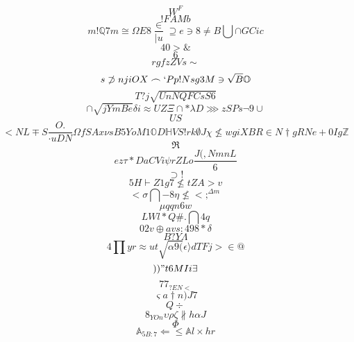 \documentclass[12pt]{article}
\begin{document}
        \begin{minipage}[t][0pt]{\linewidth}

        \[W^{F}\]
\[!FAMb\]
\[m!\mathbb{Q} 7 m\cong\Omega E 8\frac{\in}{\mid u}\supseteq e\ni 8\neq B\bigcup\cap G C i c\]
\[40>\&\]
\[6\]
\[rgfzZVs\sim\]
\[s\not\supset n j i O X\frown ` P p ! N s g 3 M\ni\sqrt{B}\mathbb{O}\]
\[T?j\sqrt{UnNQFCsS6}\]
\[\cap\sqrt{jYmBe}\delta i\approx U Z\Xi\cap *\lambda D\ggg z S {Ps}\neg 9\cup\]
\[US\]
\[<NL\mp S\frac{O.}{\cdot u D N}\Omega f S A x\nu s B 5 Y o M 1\mathbb{O} D {\mathbb{H} V S ! r k}\emptyset J\chi\nleq w g i X B R\in {N}\dagger g R N e + 0 I g\mathbb{Z}\]
\[\Re\]
\[ez\tau * D a C V i\psi r Z L o\frac{J(,NmnL}{6}\]
\[\supset !\]
\[5H\vdash Z 1 g 7\nleq t Z A > v\]
\[<\sigma\bigcap - 8\eta\nleq < ;^{\Delta m}\]
\[\mu q q n 6 w\]
\[LWl*Q\# .\bigcap 4 q\]
\[0 {2v}\oplus a v s : 4 9 8 {*}\delta\]
\[B?Y\Lambda\]
\[4\prod y r\approx u t\sqrt{\alpha 9 (}\epsilon\rangle d T F j >\in @\]
\[))"t6MIi\exists\]
\[77_{?EN<}\]
\[\varsigma a\dagger n ) J 7\]
\[Q\div\]
\[8_{YOn}\upsilon\rho\zeta\nparallel h\alpha J\]
\[\Phi\]
\[\mathbb{A}_{5B:7}\Leftarrow\leq\mathbb{A} l\times h r
        \]
\end{minipage}
\end{document}
